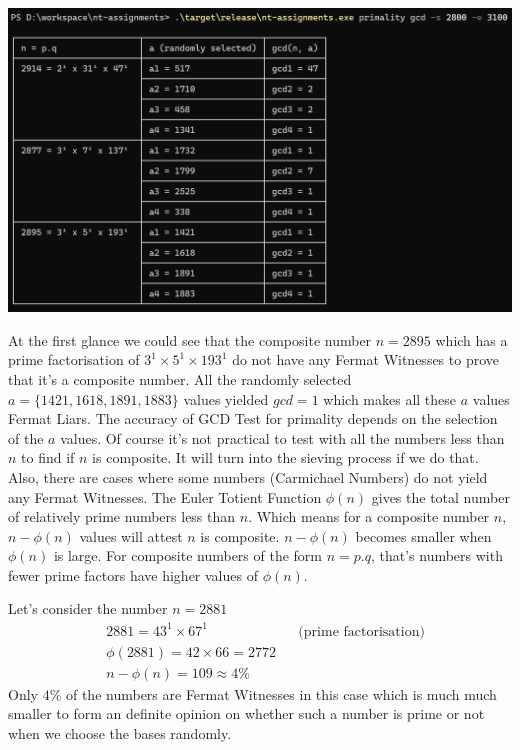 \documentclass[11pt,a4paper]{article}
\begin{document}
\begin{enumerate}[1.]
\begin{flushleft}
			\begin{minipage}{\linewidth}
				\begin{center}
					\includegraphics[scale=.45]{gcd_test_3.png}
				\end{center}
			\end{minipage}
			\bigbreak
			At the first glance we could see that the composite number $n = 2895$ which has a prime factorisation of $3^1 \times 5^1 \times 193^1$ do not have any Fermat Witnesses to prove that it's a composite number. All the randomly selected $a = \{1421, 1618, 1891, 1883\}$ values yielded  $gcd = 1$ which makes all these $a$ values Fermat Liars. \bigbreak
			The accuracy of GCD Test for primality depends on the selection of the $a$ values. Of course it's not practical to test with all the numbers less than $n$ to find if $n$ is composite. It will turn into the sieving process if we do that. Also, there are cases where some numbers (Carmichael Numbers) do not yield any Fermat Witnesses. The Euler Totient Function $\phi(n)$ gives the total number of relatively prime numbers less than $n$. Which means for a composite number $n$, $n - \phi(n)$ values will attest $n$ is composite. $n - \phi(n)$ becomes smaller when $\phi(n)$ is large. For composite numbers of the form $n = p.q$, that's numbers with fewer prime factors have higher values of $\phi(n)$. \bigskip

			Let's consider the number $n = 2881$
			\begin{align}
				& 2881 = 43^1 \times 67^1 &&\text{(prime factorisation)}\nonumber\\
				& \phi(2881) = 42 \times 66 = 2772 \nonumber\\
				& n - \phi(n) = 109 \approx 4\% \nonumber
			\end{align}
		Only $4\%$ of the numbers are Fermat Witnesses in this case which is much much smaller to form an definite opinion on whether such a number is prime or not when we choose the bases randomly.


\end{flushleft}
\end{enumerate}
\end{document}
